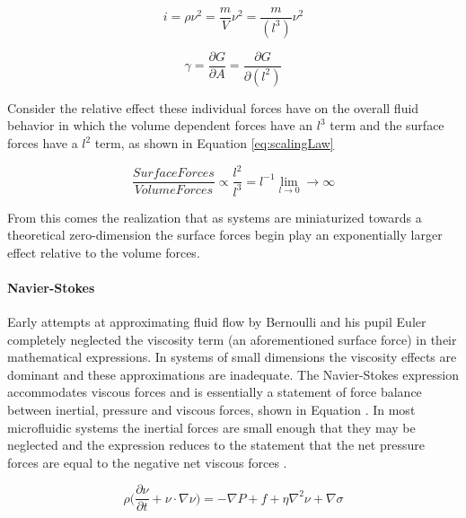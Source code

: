 \begin{equation}
i = \rho \nu^2 = \frac{m}{V}\nu^2 = \frac{m}{(l^3)}\nu^2 
\label{eq:inertia}
\end{equation}


\begin{equation}
\gamma = \frac{\partial G}{\partial A} = \frac{\partial G}{\partial (l^2)}
\label{eq:interfacial}
\end{equation}


Consider the relative effect these individual forces have on the overall fluid behavior in which the volume dependent forces have an $l^3$ term and the surface forces have a $l^2$ term, as shown in Equation \vref{eq:scalingLaw} \cite{bruus2008}

\begin{equation}
\frac{Surface Forces}{Volume Forces} \propto \frac{l^2}{l^3} = l^{-1} \lim_{l \to 0}  \rightarrow \infty
\label{eq:scalingLaw}
\end{equation}

From this comes the realization that as systems are miniaturized towards a theoretical zero-dimension the surface forces begin play an exponentially larger effect relative to the volume forces.

\paragraph{Navier-Stokes} Early attempts at approximating fluid flow by Bernoulli and his pupil Euler completely neglected the viscosity term (an aforementioned surface force) in their mathematical expressions. In systems of small dimensions the viscosity effects are dominant and these approximations are inadequate. The Navier-Stokes expression accommodates viscous forces and is essentially a statement of force balance between inertial, pressure and viscous forces, shown in Equation . In most microfluidic systems the inertial forces are small enough that they may be neglected and the expression reduces to the statement that the net pressure forces are equal to the negative net viscous forces \cite{Vyawahare2014}.

\begin{equation}
\rho \Bigg(\frac {\partial \nu}{\partial t} + \nu \cdot \nabla \nu \Bigg) = - \nabla P+ f +\eta \nabla^2 \nu + \nabla \sigma
\label{eq:navierStokes}
\end{equation}

